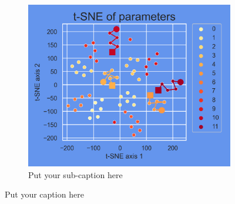 \begin{figure}[ht]
\begin{subfigure}{.5\textwidth}
		\includegraphics[width=.9\linewidth]{./figs/params_tSNE_2.png}  
		\caption{Put your sub-caption here}
		\label{fig:sub-second}
	\end{subfigure}
	\caption{Put your caption here}
	\label{fig:fig}
\end{figure}

\blindtext

